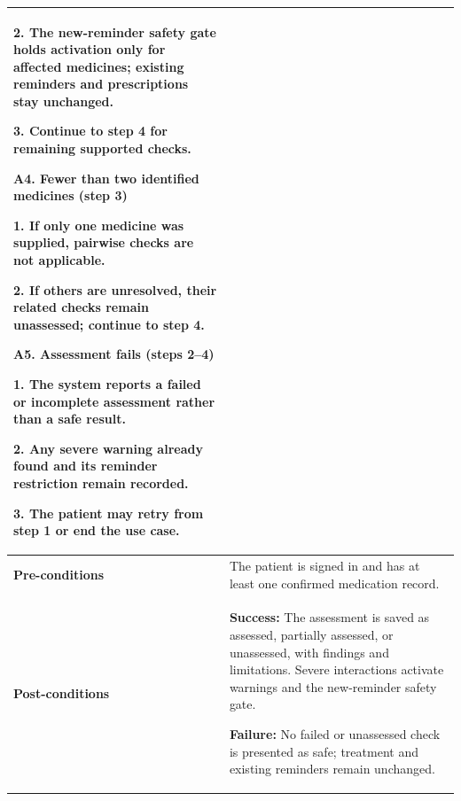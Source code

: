 \begin{longtable}{|p{}|p{}|}
2. The new-reminder safety gate holds activation only for affected medicines; existing reminders and prescriptions stay unchanged.\par
3. Continue to step 4 for remaining supported checks.
\par\smallskip
\textbf{A4. Fewer than two identified medicines (step 3)}\par
1. If only one medicine was supplied, pairwise checks are not applicable.\par
2. If others are unresolved, their related checks remain unassessed; continue to step 4.
\par\smallskip
\textbf{A5. Assessment fails (steps 2--4)}\par
1. The system reports a failed or incomplete assessment rather than a safe result.\par
2. Any severe warning already found and its reminder restriction remain recorded.\par
3. The patient may retry from step 1 or end the use case.
\\ \hline
\textbf{Pre-conditions} & The patient is signed in and has at least one confirmed medication record. \\ \hline
\textbf{Post-conditions} & \textbf{Success:} The assessment is saved as assessed, partially assessed, or unassessed, with findings and limitations. Severe interactions activate warnings and the new-reminder safety gate.\par
\textbf{Failure:} No failed or unassessed check is presented as safe; treatment and existing reminders remain unchanged. \\ \hline
\end{longtable}


